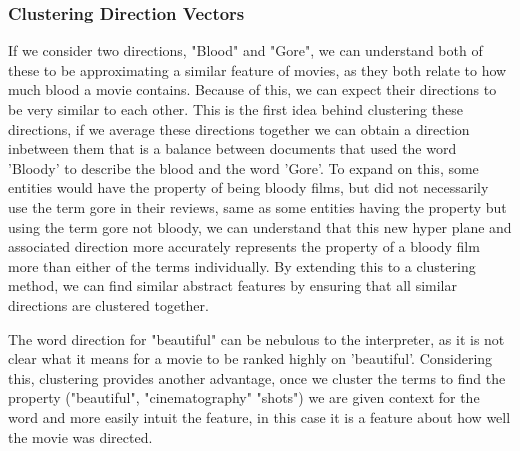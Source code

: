 \subsubsection{Clustering Direction Vectors}

If we consider two directions, "Blood" and "Gore", we can understand both of these to be approximating a similar feature of movies, as they both relate to how much blood a movie contains. Because of this, we can expect their directions to be very similar to each other. This is the first idea behind clustering these directions, if we average these directions together we can obtain a direction inbetween them that is a balance between documents that used the word 'Bloody' to describe the blood and the word 'Gore'. To expand on this, some entities would have the property of being bloody films, but did not necessarily use the term gore in their reviews, same as some entities having the property but using the term gore not bloody, we can understand that this new hyper plane and associated direction more accurately represents the property of a bloody film more than either of the terms individually. By extending this to a clustering method, we can find similar abstract features by ensuring that all similar directions are clustered together. %

The word direction for "beautiful" can be nebulous to the interpreter, as it is not clear what it means for a movie to be ranked highly on 'beautiful'. Considering this, clustering provides another advantage, once we cluster the terms to find the property ("beautiful", "cinematography" "shots") we are given context for the word and more easily intuit the feature, in this case it is a feature about how well the movie was directed. 


